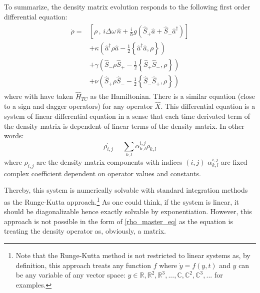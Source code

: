 \documentclass[11pt]{report}
\begin{document}
To summarize, the density matrix evolution responds to the following first order differential equation:
\begin{align}
\label{rho_master_eq}
\begin{split}
\dot{\rho} = &\left[ \rho \, , \, i\Delta\omega\,\hat{n} + \frac{i}{\hbar} g \left(\hat{S}_+ \hat{a} + \hat{S}_-\hat{a}^{\dag} \right)\right]\\
&+ \kappa \left( \hat{a}^\dagger \rho \hat{a} - \frac{1}{2} \left\lbrace \hat{a}^\dagger \hat{a}, \rho \right\rbrace \right)\\
&+ \gamma \left( \hat{S}_- \rho \hat{S}_+ - \frac{1}{2} \left\lbrace \hat{S}_+ \hat{S}_-, \rho \right\rbrace \right)\\
&+ \nu \left( \hat{S}_+ \rho \hat{S}_- - \frac{1}{2} \left\lbrace \hat{S}_- \hat{S}_+, \rho \right\rbrace \right)
\end{split}
\end{align}
where with have taken $\hat{H}_{TC}$ as the Hamiltonian. There is a similar equation (close to a sign and dagger operators) for any operator $\hat{X}$. This differential equation is a system of linear differential equation in a sense that each time derivated term of the density matrix is dependent of linear terms of the density matrix. In other words:
\begin{equation}
\dot{\rho_{i,j}} = \sum_{k,l} \alpha_{k,l}^{i,j} \rho_{k,l}
\end{equation}
where $\rho_{i,j}$ are the density matrix components with indices $(i,j)$ $\alpha_{k,l}^{i,j}$ are fixed complex coefficient dependent on operator values and constants. 

Thereby, this system is numerically solvable with standard integration methods as the Runge-Kutta approach.\footnote{Note that the Runge-Kutta method is not restricted to linear systems as, by definition, this approach treats any function $f$ where $\dot{y} = f(y, t)$ and $y$ can be any variable of any vector space: $y \in \mathbb{R}, \mathbb{R}^2, \mathbb{R}^3, ..., \mathbb{C}, \mathbb{C}^2, \mathbb{C}^3, ...$ for examples.} As one could think, if the system is linear, it should be diagonalizable hence exactly solvable by exponentiation. However, this approach is not possible in the form of \eqref{rho_master_eq} as the equation is treating the density operator as, obviously, a matrix. 
\end{document}
